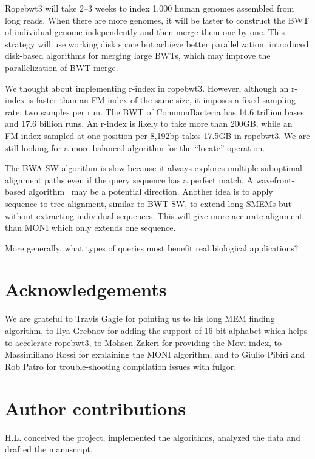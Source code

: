 \documentclass[webpdf,contemporary,large,namedate]{oup-authoring-template}%
\begin{document}
Ropebwt3 will take 2--3 weeks to index 1,000 human genomes assembled from long reads.
When there are more genomes, it will be faster to construct the BWT of individual genome independently
and then merge them one by one.
This strategy will use working disk space but achieve better parallelization.
\citet{DBLP:conf/dcc/Siren16} introduced disk-based algorithms for merging large BWTs, which may improve the parallelization of BWT merge.

We thought about implementing r-index in ropebwt3.
However, although an r-index is faster than an FM-index of the same size,
it imposes a fixed sampling rate: two samples per run.
The BWT of CommonBacteria has 14.6 trillion bases and 17.6 billion runs.
An r-index is likely to take more than 200GB,
while an FM-index sampled at one position per 8,192bp takes 17.5GB in ropebwt3.
We are still looking for a more balanced algorithm for the ``locate'' operation.

The BWA-SW algorithm is slow because it always explores multiple suboptimal alignment paths even if the query sequence has a perfect match.
A wavefront-based algorithm~\citep{Marco-Sola:2021aa} may be a potential direction.
Another idea is to apply sequence-to-tree alignment, similar to BWT-SW, to extend long SMEMs but without extracting individual sequences.
This will give more accurate alignment than MONI which only extends one sequence.

More generally, what types of queries most benefit real biological applications?

\section*{Acknowledgements}

We are grateful to Travis Gagie for pointing us to his long MEM finding algorithm,
to Ilya Grebnov for adding the support of 16-bit alphabet which helps to accelerate ropebwt3,
to Mohsen Zakeri for providing the Movi index,
to Massimiliano Rossi for explaining the MONI algorithm,
and to Giulio Pibiri and Rob Patro for trouble-shooting compilation issues with fulgor.

\section*{Author contributions}

H.L. conceived the project, implemented the algorithms, analyzed the data and drafted the manuscript.
\end{document}
